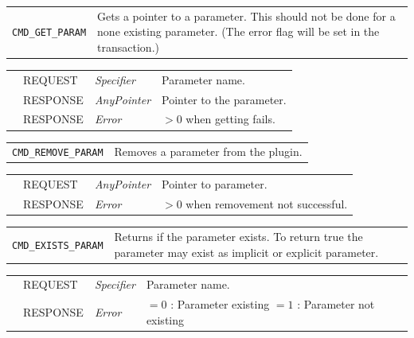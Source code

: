 \vspace{1 cm}

\noindent
\begin{tabularx}{\textwidth}{|p{3.6cm}|X|}
	\cline{1-1}\cline{2-2}
	  \lstinline|CMD_GET_PARAM| & Gets a pointer to a parameter. This should not be done for a none existing parameter. (The error flag will be set in the transaction.)\\
\end{tabularx}
\begin{tabularx}{\textwidth}{|p{3.6cm}|p{2.3cm}|p{2cm}|X|}
	\cline{1-1}\cline{2-2}\cline{3-3}\cline{4-4}
	   &  REQUEST     &  {\em Specifier}   &  Parameter name.   \\
	\cline{1-1}\cline{2-2}\cline{3-3}\cline{4-4}                        &  RESPONSE    &  {\em AnyPointer} &  Pointer to the parameter.   \\
	\cline{1-1}\cline{2-2}\cline{3-3}\cline{4-4}                        &  RESPONSE    &  {\em Error}  &  $>0$ when getting fails.   \\
	\hline
\end{tabularx}

\vspace{1 cm}

\noindent
\begin{tabularx}{\textwidth}{|p{3.6cm}|X|}
	\cline{1-1}\cline{2-2}
	  \lstinline|CMD_REMOVE_PARAM| & Removes a parameter from the plugin.\\
\end{tabularx}
\begin{tabularx}{\textwidth}{|p{3.6cm}|p{2.3cm}|p{2cm}|X|}
	\cline{1-1}\cline{2-2}\cline{3-3}\cline{4-4}
	   &  REQUEST     &  {\em AnyPointer}   &  Pointer to parameter.   \\
	\cline{1-1}\cline{2-2}\cline{3-3}\cline{4-4}                        &  RESPONSE    &  {\em Error}  &  $>0$ when removement not successful. \\
	\hline
\end{tabularx}

\vspace{1 cm}

\noindent
\begin{tabularx}{\textwidth}{|p{3.6cm}|X|}
	\cline{1-1}\cline{2-2}
	  \lstinline|CMD_EXISTS_PARAM| & Returns if the parameter exists. To return true the parameter may exist as implicit or explicit parameter. \\
\end{tabularx}
\begin{tabularx}{\textwidth}{|p{3.6cm}|p{2.3cm}|p{2cm}|X|}
	\cline{1-1}\cline{2-2}\cline{3-3}\cline{4-4}
	   &  REQUEST     &  {\em Specifier}   &  Parameter name.   \\
	\cline{1-1}\cline{2-2}\cline{3-3}\cline{4-4}                        &  RESPONSE    &  {\em Error}  &  $=0$ : Parameter existing \newline $=1$ : Parameter not existing   \\
	\hline
\end{tabularx}

